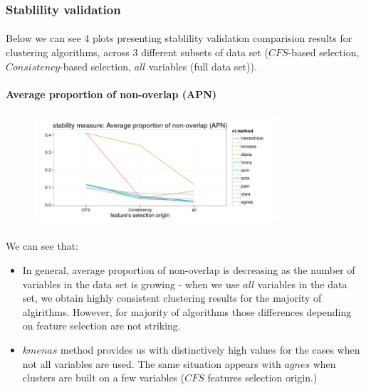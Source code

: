 \documentclass[10pt]{article}\usepackage[]{graphicx}\usepackage[]{color}
\begin{document}
\subsubsection{Stablility validation}
\paragraph{}
Below we can see 4 plots presenting stablility validation comparision results for clustering algorithms, across 3 different subsets of data set ($CFS$-based selection, $Consistency$-based selection, $all$ variables (full data set)).

\clearpage
\paragraph{Average proportion of non-overlap (APN)} 
\begin{figure}[h!]
\centering
\includegraphics[width=0.8\textwidth]{Plots2/comp1-APN.png}
\end{figure}
\paragraph{}
We can see that:
\begin{itemize}
\item In general, average proportion of non-overlap is decreasing as the 
number of variables in the data set is growing - when we use $all$ variables in
the data set, we obtain highly consistent clustering results for the majority 
of algirithms. However, for majority of algorithms those differences depending on
feature selection are not striking. 
\item $kmenas$ method provides us with distinctively high values for the cases
when not all variables are used. The same situation appears with $agnes$ when 
clusters are built on a few variables ($CFS$ features selection origin.)
\end{itemize}
\end{document}
